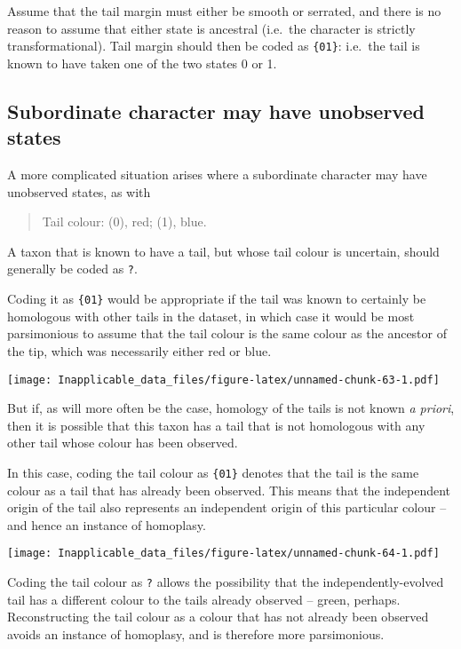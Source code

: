 \documentclass[]{book}
\theoremstyle{definition}
\theoremstyle{definition}
\theoremstyle{definition}
\theoremstyle{remark}
\begin{document}
Assume that the tail margin must either be smooth or serrated, and there
is no reason to assume that either state is ancestral (i.e.~the
character is strictly transformational). Tail margin should then be
coded as \texttt{\{01\}}: i.e.~the tail is known to have taken one of
the two states 0 or 1.

\hypertarget{subordinate-character-may-have-unobserved-states}{%
\subsection{Subordinate character may have unobserved
states}\label{subordinate-character-may-have-unobserved-states}}

A more complicated situation arises where a subordinate character may
have unobserved states, as with

\begin{quote}
Tail colour: (0), red; (1), blue.
\end{quote}

A taxon that is known to have a tail, but whose tail colour is
uncertain, should generally be coded as \texttt{?}.

Coding it as \texttt{\{01\}} would be appropriate if the tail was known
to certainly be homologous with other tails in the dataset, in which
case it would be most parsimonious to assume that the tail colour is the
same colour as the ancestor of the tip, which was necessarily either red
or blue.

\texttt{[image: Inapplicable\_data\_files/figure-latex/unnamed-chunk-63-1.pdf]}

But if, as will more often be the case, homology of the tails is not
known \emph{a priori}, then it is possible that this taxon has a tail
that is not homologous with any other tail whose colour has been
observed.

In this case, coding the tail colour as \texttt{\{01\}} denotes that the
tail is the same colour as a tail that has already been observed. This
means that the independent origin of the tail also represents an
independent origin of this particular colour -- and hence an instance of
homoplasy.

\texttt{[image: Inapplicable\_data\_files/figure-latex/unnamed-chunk-64-1.pdf]}

Coding the tail colour as \texttt{?} allows the possibility that the
independently-evolved tail has a different colour to the tails already
observed -- green, perhaps. Reconstructing the tail colour as a colour
that has not already been observed avoids an instance of homoplasy, and
is therefore more parsimonious.
\end{document}
